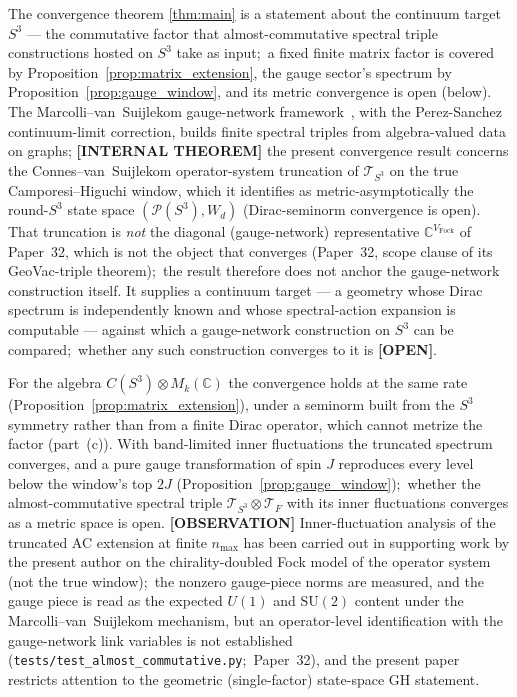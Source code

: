 \documentclass[11pt,a4paper]{article}
\theoremstyle{plain}
\theoremstyle{definition}
\newcommand{\nmax}{n_{\max}}
\newcommand{\sthree}{S^{3}}
\newcommand{\Tcal}{\mathcal{T}}
\newcommand{\C}{\mathbb{C}}
\begin{document}
The convergence theorem
\ref{thm:main} is a statement about the continuum target $\sthree$ ---
the commutative factor that almost-commutative spectral triple
constructions hosted on $\sthree$ take as input;\ a fixed finite matrix
factor is covered by Proposition~\ref{prop:matrix_extension}, the
gauge sector's spectrum by Proposition~\ref{prop:gauge_window}, and its
metric convergence is open (below). The
Marcolli--van~Suijlekom gauge-network
framework~\cite{marcolli_vs2014}, with the
Perez-Sanchez~\cite{perez_sanchez2025} continuum-limit
correction, builds finite spectral triples from algebra-valued data on
graphs;
\textbf{[INTERNAL THEOREM]} the present convergence result concerns
the Connes--van~Suijlekom operator-system truncation of
$\Tcal_{\sthree}$ on the true Camporesi--Higuchi window, which it
identifies as metric-asymptotically the round-$\sthree$ state space
$(\mathcal{P}(\sthree), W_d)$ (Dirac-seminorm convergence is open). That truncation is \emph{not} the diagonal
(gauge-network) representative $\mathbb{C}^{V_{\mathrm{Fock}}}$ of
Paper~32, which is not the object that converges (Paper~32, scope
clause of its GeoVac-triple theorem);\ the result therefore does not
anchor the gauge-network construction itself. It supplies a continuum
target --- a geometry whose Dirac spectrum is independently known and
whose spectral-action expansion is computable --- against which a
gauge-network construction on $\sthree$ can be compared;\ whether any
such construction converges to it is \textbf{[OPEN]}.

For the algebra $C(\sthree) \otimes M_k(\C)$ the convergence holds at
the same rate (Proposition~\ref{prop:matrix_extension}), under a
seminorm built from the $\sthree$ symmetry rather than from a finite
Dirac operator, which cannot metrize the factor
(part~(c)). With band-limited inner fluctuations the truncated spectrum
converges, and a pure gauge transformation of spin $J$ reproduces every
level below the window's top $2J$
(Proposition~\ref{prop:gauge_window});\ whether the almost-commutative
spectral triple $\Tcal_{\sthree} \otimes \Tcal_F$ with its inner
fluctuations converges as a metric space is open.
\textbf{[OBSERVATION]} Inner-fluctuation analysis of the truncated AC
extension at finite $\nmax$ has been carried out in supporting work by
the present author on the chirality-doubled Fock model of the operator
system (not the true window);\ the nonzero gauge-piece norms are
measured, and the gauge piece is read as the expected $U(1)$ and
$\mathrm{SU}(2)$ content under the Marcolli--van~Suijlekom mechanism,
but an operator-level identification with the gauge-network link
variables is not established (\texttt{tests/test\_almost\_commutative.py};\
Paper~32), and the present paper restricts
attention to the geometric (single-factor) state-space GH statement.
\end{document}

